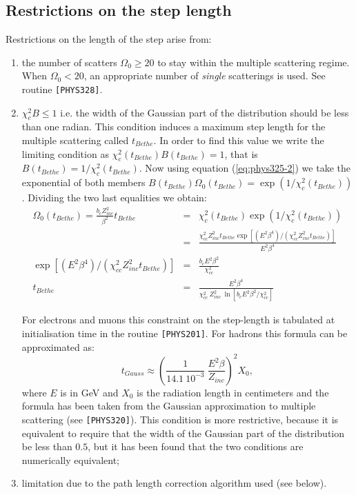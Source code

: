 \subsection{Restrictions on the step length}
Restrictions on the length of the step arise from:
\begin{enumerate}
\item the number of scatters
$\Omega_0 \geq 20 $ to stay within the multiple scattering regime. When
$\Omega_0 < 20$, an appropriate number of {\it single} scatterings is
used. See routine  {\tt [PHYS328]}.
\item
$\chi_c^2B \leq 1 $ i.e. the width of the Gaussian part of the distribution
should be less than one radian. This
condition induces a maximum step length for the multiple scattering called
$t_{Bethe}$. In order to find this value we write the limiting condition
as $\chi_c^2(t_{Bethe})B(t_{Bethe}) = 1 $, that is 
$B(t_{Bethe}) = 1/\chi_c^2(t_{Bethe})$. Now using equation 
(\ref{eq:phys325-2}) we take the exponential of both members 
$B(t_{Bethe}) \Omega_0(t_{Bethe}) = \exp(1/\chi_c^2(t_{Bethe}))$. 
Dividing the two last equalities we obtain:
\begin{eqnarray*}
\Omega_0(t_{Bethe}) = \frac{b_c Z_{inc}^2}{\beta^2} t_{Bethe} & = & 
\chi_c^2 (t_{Bethe})\exp(1/\chi_c^2(t_{Bethe})) \\
&  = & \frac{\chi_{cc}^2 Z_{inc}^2 t_{Bethe} 
\exp{[(E^2\beta^4)/(\chi_{cc}^2 Z_{inc}^2 t_{Bethe})]}}
{E^2\beta^4} \\
\exp{[(E^2\beta^4)/(\chi_{cc}^2 Z_{inc}^2 t_{Bethe})]} & = & 
\frac{b_c E^2 \beta^2}{\chi_{cc}^2} \\
t_{Bethe} & = & \frac{E^2 \beta^4}{\chi_{cc}^2 \: Z_{inc}^2 \: \ln
\left [b_c E^2 \beta^2/\chi_{cc}^2 \right]}
\end{eqnarray*}
 
For electrons and muons this constraint on the step-length is tabulated
at initialisation time in the routine  {\tt [PHYS201]}.
For hadrons this formula can be approximated as:
\[
t_{Gauss}
\approx \left(\frac{1}{14.1 \: 10^{-3}} \: \frac{E^2 \beta}{Z_{inc}}
\right )^2 X_0,
\]
where $E$ is in GeV and $X_0$ is the radiation length in centimeters and
the formula has been taken from the Gaussian approximation to multiple
scattering (see {\tt [PHYS320]}). This condition is more restrictive, 
because it is equivalent to require that the width of the Gaussian
part of the distribution be less than $0.5$, but it has been found that
the two conditions are numerically equivalent;
\item limitation due to the path length correction algorithm used (see
below).
\end{enumerate}
